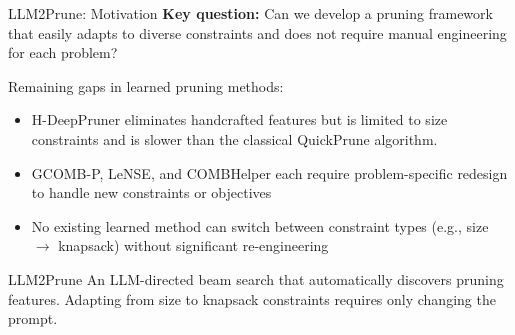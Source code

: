 \documentclass[aspectratio=169,xcolor=dvipsnames,8pt]{beamer}
\begin{document}
\begin{frame}{LLM2Prune: Motivation}
  \textbf{Key question:} Can we develop a pruning framework that easily adapts
  to diverse constraints and does not require manual engineering for each problem?

  \vspace{0.3cm}

  Remaining gaps in learned pruning methods:
  \begin{itemize}
    \item H-DeepPruner eliminates handcrafted features but is limited to size constraints and is slower than the classical QuickPrune algorithm.
    \item GCOMB-P, LeNSE, and COMBHelper each require
      problem-specific redesign to handle new constraints or objectives
    \item No existing learned method can switch between constraint types
      (e.g., size $\to$ knapsack) without significant re-engineering
  \end{itemize}

  \vspace{0.3cm}

  \begin{block}{LLM2Prune}
    An LLM-directed beam search that automatically discovers pruning
    features. Adapting from size to knapsack constraints requires only changing
    the prompt.
  \end{block}
\end{frame}
\end{document}

